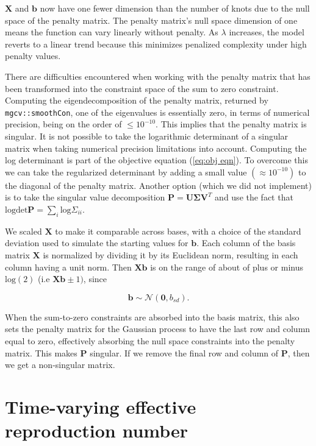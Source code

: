 \documentclass[
11pt, %
oneside, %
english, %
singlespacing, %
]{macthesis} %
\begin{document}
\(\mathbf{X}\) and \(\mathbf{b}\) now have one fewer dimension than the number of knots due to the null space of the penalty matrix. The penalty matrix's null space dimension of one means the function can vary linearly without penalty. As \(\lambda\) increases, the model reverts to a linear trend because this minimizes penalized complexity under high penalty values.

There are difficulties encountered when working with the penalty matrix that has been transformed into the constraint space of the sum to zero constraint. Computing the eigendecomposition of the penalty matrix, returned by \texttt{mgcv::smoothCon}, one of the eigenvalues is essentially zero, in terms of numerical precision, being on the order of \(\leq 10^{-10}\). This implies that the penalty matrix is singular. It is not possible to take the logarithmic determinant of a singular matrix when taking numerical precision limitations into account. Computing the log determinant is part of the objective equation (\ref{eq:obj eqn}). To overcome this we can take the regularized determinant by adding a small value \((\approx 10^{-10})\) to the diagonal of the penalty matrix. Another option (which we did not implement) is to take the singular value decomposition \(\mathbf{P} = \mathbf{U}\mathbf{\Sigma} \mathbf{V}^T\) and use the fact that \(\text{logdet}\mathbf{P}= \sum_i \text{log}\Sigma_{ii}\).

We scaled \(\mathbf{X}\) to make it comparable across bases, with a choice of the standard deviation used to simulate the starting values for \(\mathbf{b}\). Each column of the basis matrix \(\mathbf{X}\) is normalized by dividing it by its Euclidean norm, resulting in each column having a unit norm. Then \(\mathbf{X}\mathbf{b}\) is on the range of about of plus or minus \(\text{log}(2)\) (i.e \(\mathbf{X}\mathbf{b} \pm 1)\), since

\[
\mathbf{b} \sim \mathcal{N}(\mathbf{0}, b_{sd}).
\]

When the sum-to-zero constraints are absorbed into the basis matrix, this also sets the penalty matrix for the Gaussian process to have the last row and column equal to zero, effectively absorbing the null space constraints into the penalty matrix. This makes \(\mathbf{P}\) singular. If we remove the final row and column of \(\mathbf{P}\), then we get a non-singular matrix.

\section{Time-varying effective reproduction number}\label{Time-varying-effective-reproduction-number}
\end{document}
